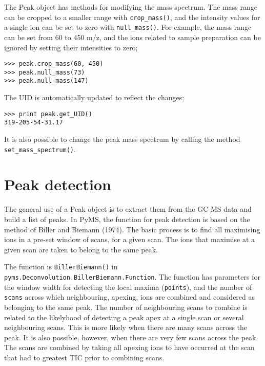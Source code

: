 
The Peak object has methods for modifying the mass spectrum. The mass range can
be cropped to a smaller range with {\tt crop\_mass()}, and the intensity
values for a single ion can be set to zero with {\tt null\_mass()}. For
example, the mass range can be set from 60 to 450 m/z, and the ions related to
sample preparation can be ignored by setting their intensities to zero;

\begin{verbatim}
>>> peak.crop_mass(60, 450)
>>> peak.null_mass(73)
>>> peak.null_mass(147)
\end{verbatim}

\noindent
The UID is automatically updated to reflect the changes;

\begin{verbatim}
>>> print peak.get_UID()
319-205-54-31.17
\end{verbatim}

It is also possible to change the peak mass spectrum by calling the
method {\tt set\_mass\_spectrum()}.

\section{Peak detection}

The general use of a Peak object is to extract them from the GC-MS data and
build a list of peaks. In PyMS, the function for peak detection is based on the
method of Biller and Biemann (1974)\cite{biller74}. The basic process is to find
all maximising ions in a pre-set window of scans, for a given scan.  The ions
that maximise at a given scan are taken to belong to the same peak.

The function is {\tt BillerBiemann()} in
{\tt pyms.Deconvolution.BillerBiemann.Function}. The function has parameters for
the window width for detecting the local maxima ({\tt points}), and the number
of {\tt scans} across which neighbouring, apexing, ions are combined and
considered as belonging to the same peak. The number of neighbouring scans to
combine is related to the likelyhood of detecting a peak apex at a single scan
or several neighbouring scans. This is more likely when there are many scans
across the peak. It is also possible, however, when there are very few scans
across the peak. The scans are combined by taking all apexing ions to have
occurred at the scan that had to greatest TIC prior to combining scans.

